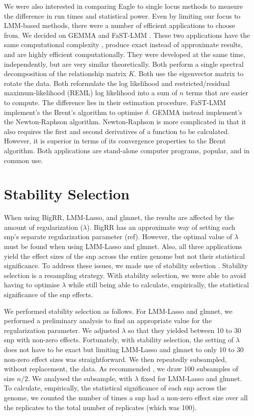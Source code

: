 \documentclass{nature}
\begin{document}
We were also interested in comparing Eagle to single locus methods to measure the difference in run times and statistical power. Even by limiting our focus to LMM-based methods, there were a number of efficient applications to choose from. 
We decided on GEMMA \cite{zhou2012genome} and FaST-LMM \cite{lippert2011fast}. These two applications have the same computational complexity \cite{zhou2012genome}, produce exact instead of approximate results, and are highly efficient computationally. They were developed at the same time, independently, but are very similar theoretically. Both perform a single spectral decomposition of the relationship matrix $K$. Both use the eigenvector matrix to rotate the data. Both reformulate the log likelihood and 
restricted/residual maximum-likelihood (REML) 
log likelihood into a sum of $n$ terms that are easier to compute. The difference lies in their estimation procedure. FaST-LMM implement's the Brent's algorithm to optimise $\delta$. GEMMA instead implement's the Newton-Raphson algorithm. Newton-Raphson is more complicated in that it also requires the first and second derivatives of a function to be calculated. However, it is superior in terms of its convergence properties to the Brent algorithm.  Both applications are stand-alone computer programs, popular, and in common use.


\section{Stability Selection}
When using BigRR, LMM-Lasso, and glmnet, the results are affected by the amount of regularization ($\lambda$). 
BigRR has an approximate way of setting each snp's separate regularization parameter (ref). However, the optimal value of 
$\lambda$ must be found when using LMM-Lasso and glmnet. Also, 
all three applications yield the effect sizes of the snp across the entire genome but not their statistical significance. To address 
these issues, we made use of stability selection \cite{meinshausen2010stability}. 
Stability selection is a resampling strategy.  With stability selection, we were able to avoid having to optimise $\lambda$ while 
still being able to calculate, empirically, the statistical significance of the snp effects.

We performed stability selection as follows. For LMM-Lasso and glmnet, we performed a preliminary analysis to find an 
appropriate value for the regularization parameter.  We adjusted $\lambda$ so that they yielded 
between 10 to 30 snp with non-zero effects. Fortunately, with stability selection, the setting of $\lambda$ does not have to be exact 
but limiting LMM-Lasso and glmnet to only 10 to 30 non-zero effect sizes was straightforward. We then repeatedly subsampled, 
without replacement, the data. As recommended \cite{meinshausen2010stability}, we draw 100 subsamples of size $n/2$. We 
analysed the subsample, with $\lambda$ fixed for LMM-Lasso and glmnet.  To calculate, empirically,  the statistical significance of each 
snp across the genome, we counted the number of times a snp had a non-zero effect size over all the replicates to the total 
number of replicates (which was 100). 
\end{document}
